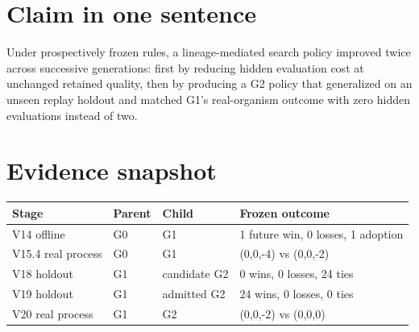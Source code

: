 \section*{Claim in one sentence}
Under prospectively frozen rules, a lineage-mediated search policy improved twice across successive generations: first by reducing hidden evaluation cost at unchanged retained quality, then by producing a G2 policy that generalized on an unseen replay holdout and matched G1's real-organism outcome with zero hidden evaluations instead of two.

\section*{Evidence snapshot}
\begin{center}
\begin{tabular}{@{}llll@{}}
\toprule
Stage & Parent & Child & Frozen outcome \\
\midrule
V14 offline & G0 & G1 & 1 future win, 0 losses, 1 adoption \\
V15.4 real process & G0 & G1 & (0,0,-4) vs (0,0,-2) \\
V18 holdout & G1 & candidate G2 & 0 wins, 0 losses, 24 ties \\
V19 holdout & G1 & admitted G2 & 24 wins, 0 losses, 0 ties \\
V20 real process & G1 & G2 & (0,0,-2) vs (0,0,0) \\
\bottomrule
\end{tabular}
\end{center}
